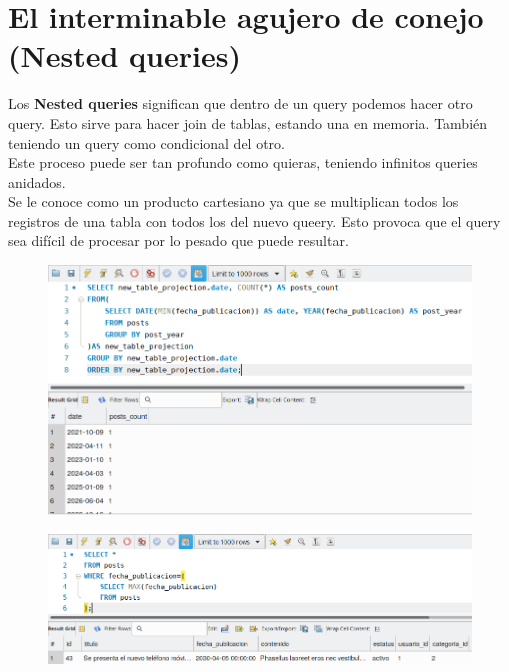 \documentclass{article}
\begin{document}
\section{El interminable agujero de conejo (Nested queries)}%
Los \textbf{Nested queries} significan que dentro de un query podemos hacer
otro query. Esto sirve para hacer join de tablas, estando una en memoria.
También teniendo un query como condicional del otro.\\

Este proceso puede ser tan profundo como quieras, teniendo infinitos queries anidados.\\
Se le conoce como un producto cartesiano ya que se multiplican todos los
registros de una tabla con todos los del nuevo queery. Esto provoca que el
query sea difícil de procesar por lo pesado que puede resultar.

\begin{figure}[h!]
  \centering
  \includegraphics[scale=0.75]{./Pictures/133_select_anidado.png}
\end{figure}

\begin{figure}[h!]
  \centering
  \includegraphics[scale=0.75]{./Pictures/134_where_anidado.png}
\end{figure}


\end{document}
